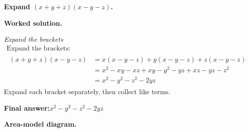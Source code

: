 \documentclass[11pt]{article}
\newcommand{\question}[1]{\par\medskip\noindent\textbf{#1}\par}
\begin{document}
\question{Expand \(  (x+y+z)(x-y-z) \).}

\textbf{Worked solution.}

\textit{Expand the brackets}
\[\begin{gathered}
\text{Expand the brackets:} \\[1em] \begin{aligned} (x+y+z)(x-y-z) & = x(x-y-z)+y(x-y-z)+z(x-y-z) \\ &= x^2-xy-xz+xy-y^2-yz+xz-yz-z^2 \\ &= x^2-y^2-z^2-2yz \end{aligned}
\end{gathered}\]
Expand each bracket separately, then collect like terms.

\begin{answerbox}
\textbf{Final answer:}\quad \(\displaystyle x^2-y^2-z^2-2yz\)
\end{answerbox}
\textbf{Area-model diagram.}
\end{document}
